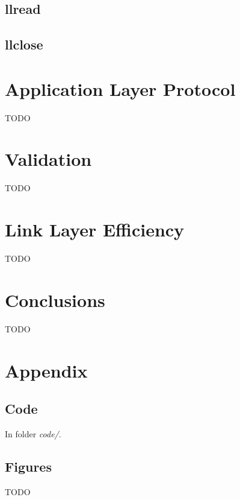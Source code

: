 \documentclass[11pt,a4paper]{article}
\begin{document}
\subsection{llread}

\subsection{llclose}

\section{Application Layer Protocol}

TODO

\section{Validation}

TODO

\section{Link Layer Efficiency}

TODO

\section{Conclusions}

TODO

\pagebreak
\appendix
\section{Appendix}

\subsection{Code}

In folder \textit{code/}.

\subsection{Figures}

TODO
\end{document}
